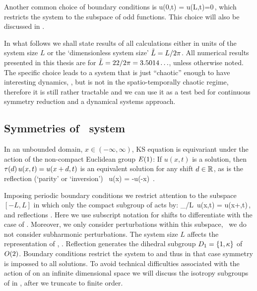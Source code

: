 Another common choice of boundary conditions is
\beq
  u(0,t) = u(L,t)=0\,,
 \label{eq:KSodd}
\eeq
which restricts the system to the subspace of odd functions. This choice will also be discussed
in .

In what follows
we shall state results of all calculations either in units of the system size $L$
or the `dimensionless system size' $\tilde{L}=L/2\pi$.
All numerical results presented in this thesis
are for $\tilde{L}=22/2\pi = 3.5014\ldots$, unless otherwise
noted. The specific choice leads to a system that is just ``chaotic'' enough
to have interesting dynamics, \cf {}, but is not in the spatio-temporally chaotic
regime, therefore it is still rather tractable and we can use it as a test bed for
continuous symmetry reduction and a dynamical systems approach.


\subsection{Symmetries of \KS\ system}
\label{sec:KSeSymm}

In an unbounded domain, $x\in(-\infty,\infty)$, KS equation is equivariant
under the action of the non-compact Euclidean group $E(1)$:
If $u(x,t)$ is a solution, then
$\tau({d})\, u(x,t) = u(x+d,t)$
is an equivalent solution for any shift
$d\in\mathbb{R}^{}$, as is the reflection (`parity' or `inversion')
\beq
    \Refl \, u(x) = -u(-x)
\,.

Imposing periodic boundary conditions we restrict attention to the subspace 
$[-L,L]$ in which only the compact subgroup  of  acts by:
\beq
	\Shift_{\shift/L}\, u(x,t) = u(x+\shift,t)\,,\qquad \shift\in\left[-L/2,L/2\right]	
	\label{KSshift}
\eeq
and reflections . Here we use subscript
notation for shifts to differentiate with the case of .
Moreover, we only consider perturbations within this subspace,
\ie\ we do not consider subharmonic perturbations. The system
size $L$ affects the representation of , \cf
{}.  Reflection
generates the dihedral subgroup $D_{1} = \{1, \kappa\}$ of
$O(2)$. Boundary conditions  restrict the
system to  and thus in that case symmetry 
is impossed to all solutions. To avoid technical difficulties
associated with the action of  on an infinite dimensional
space we will discuss the isotropy subgroups of  in
, after we truncate  to finite
order.


